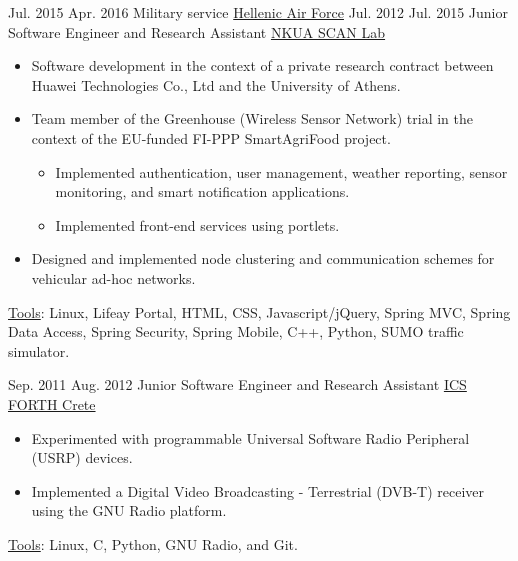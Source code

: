 \documentclass[letterpaper]{style/twentysecondcv} %
\begin{document}
\newpage     %
\makeprofile %

\vspace{1.4em}

\begin{twenty}
	\twentyplusitem
		{Jul. 2015}
		{Apr. 2016}
		{Military service}
		{\href{https://www.haf.gr/en/}{Hellenic Air Force}}
		{}
		{%
			\vspace{1.0em}
		}
	\twentyplusitem
		{Jul. 2012}
		{Jul. 2015}
		{Junior Software Engineer and Research Assistant}
		{\href{http://scan.di.uoa.gr/}{NKUA SCAN Lab}}
		{}
		{%
			\begin{itemize}
				\item Software development in the context of a private research contract between Huawei Technologies Co., Ltd and the University of Athens. 
				\item Team member of the Greenhouse (Wireless Sensor Network) trial in the context of the EU-funded FI-PPP SmartAgriFood project.
				\begin{itemize}
					\item Implemented authentication, user management, weather reporting, sensor monitoring, and smart notification applications.
					\item Implemented front-end services using portlets.
				\end{itemize}%
				\item Designed and implemented node clustering and communication schemes for vehicular ad-hoc networks.
			\end{itemize}%
			\vspace{0.5em}
			\underline{Tools}: Linux, Lifeay Portal, HTML, CSS, Javascript/jQuery, Spring MVC, Spring Data Access, Spring Security, Spring Mobile, C++, Python, SUMO traffic simulator.
			\vspace{1.0em}
		}
	\twentyplusitem
		{Sep. 2011}
		{Aug. 2012}
		{Junior Software Engineer and Research Assistant}
		{\href{https://www.ics.forth.gr/}{ICS FORTH Crete}}
		{}
		{
			\begin{itemize}
				\item Experimented with programmable Universal Software Radio Peripheral (USRP) devices.
				\item Implemented a Digital Video Broadcasting - Terrestrial (DVB-T) receiver using the GNU Radio platform.
			\end{itemize}
			\vspace{0.5em}
			\underline{Tools}: Linux, C, Python, GNU Radio, and Git.
		}
\end{twenty}
\end{document}
